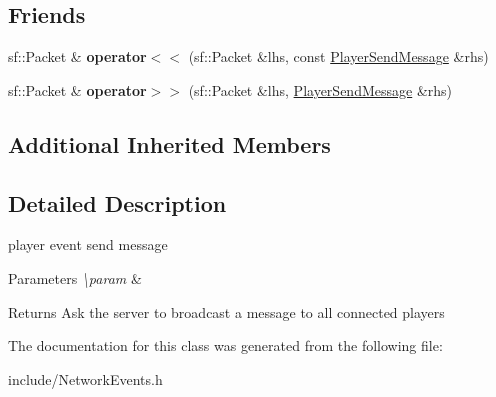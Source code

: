 \subsection*{Friends}
\begin{DoxyCompactItemize}
\item 
\hypertarget{class_player_send_message_a6b7d49cde2d46ceabc7d9bd6c9039217}{sf\-::\-Packet \& {\bfseries operator$<$$<$} (sf\-::\-Packet \&lhs, const \hyperlink{class_player_send_message}{Player\-Send\-Message} \&rhs)}\label{class_player_send_message_a6b7d49cde2d46ceabc7d9bd6c9039217}

\item 
\hypertarget{class_player_send_message_ad65ad6dec4004a991901f00db0421d55}{sf\-::\-Packet \& {\bfseries operator$>$$>$} (sf\-::\-Packet \&lhs, \hyperlink{class_player_send_message}{Player\-Send\-Message} \&rhs)}\label{class_player_send_message_ad65ad6dec4004a991901f00db0421d55}

\end{DoxyCompactItemize}
\subsection*{Additional Inherited Members}


\subsection{Detailed Description}
player event send message 


\begin{DoxyParams}{Parameters}
{\em \textbackslash{}param} & \\
\hline
\end{DoxyParams}
\begin{DoxyReturn}{Returns}
Ask the server to broadcast a message to all connected players 
\end{DoxyReturn}


The documentation for this class was generated from the following file\-:\begin{DoxyCompactItemize}
\item 
include/Network\-Events.\-h\end{DoxyCompactItemize}
